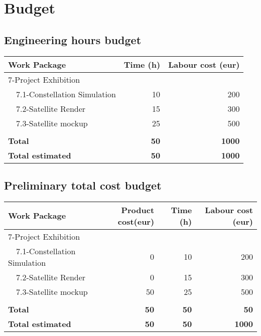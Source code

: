 \documentclass[12pt, titlepage]{article}
\begin{document}
\section{Budget}


\subsection{Engineering hours budget}
\begin{tabular}{ | l | r | r | }
\hline
Work Package & Time (h) & Labour cost (eur) \\ \hline
7-Project Exhibition &  &  \\ \hline
~~7.1-Constellation Simulation & 10 & 200 \\ \hline
~~7.2-Satellite Render & 15 & 300 \\ \hline
~~7.3-Satellite mockup & 25 & 500\\ \hline
 &  &  \\ \hline
\textbf{Total} & \textbf{50} & \textbf{1000} \\ \hline
\textbf{Total estimated} & \textbf{50} & \textbf{1000} \\
\hline
\end{tabular}
 

\subsection{Preliminary total cost budget} 
\begin{tabular}{ | l | r | r | r | }
\hline
Work Package & Product cost(eur) & Time (h) & Labour cost (eur) \\ \hline
7-Project Exhibition &  &  &  \\ \hline
~~7.1-Constellation Simulation & 0 &  10 & 200 \\ \hline
~~7.2-Satellite Render & 0 & 15 & 300 \\ \hline
~~7.3-Satellite mockup & 50 & 25 & 500 \\ \hline
 &  &  &  \\ \hline
\textbf{Total} & \textbf{50} & \textbf{50} & \textbf{50} \\ \hline
\textbf{Total estimated} & \textbf{50} & \textbf{50} & \textbf{1000} \\
\hline
\end{tabular}


\pagebreak


\end{document}

